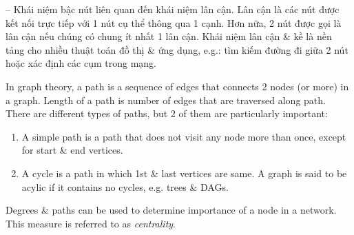 \documentclass{article}
\begin{document}
\begin{itemize}
\begin{itemize}
\begin{itemize}
            -- Khái niệm bậc nút liên quan đến khái niệm lân cận. Lân cận là các nút được kết nối trực tiếp với 1 nút cụ thể thông qua 1 cạnh. Hơn nữa, 2 nút được gọi là lân cận nếu chúng có chung ít nhất 1 lân cận. Khái niệm lân cận \& kề là nền tảng cho nhiều thuật toán đồ thị \& ứng dụng, e.g.: tìm kiếm đường đi giữa 2 nút hoặc xác định các cụm trong mạng.

            In graph theory, a path is a sequence of edges that connects 2 nodes (or more) in a graph. Length of a path is number of edges that are traversed along path. There are different types of paths, but 2 of them are particularly important:
            \begin{enumerate}
                \item A simple path is a path that does not visit any node more than once, except for start \& end vertices.
                \item A cycle is a path in which 1st \& last vertices are same. A graph is said to be acylic if it contains no cycles, e.g. trees \& DAGs.
            \end{enumerate}
            Degrees \& paths can be used to determine importance of a node in a network. This measure is referred to as {\it centrality}.


\end{itemize}
\end{itemize}
\end{itemize}
\end{document}
